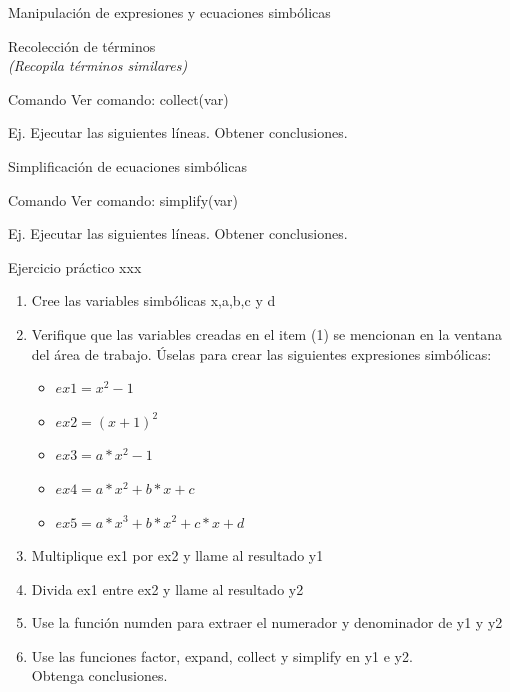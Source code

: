 \documentclass{bredelebeamer}
\begin{document}
\begin{frame}{Manipulación de expresiones y ecuaciones simbólicas}
\begin{center}
Recolección de términos\\
\textit{(Recopila términos similares)}
\end{center}
\begin{exampleblock}{Comando}
Ver comando: collect(var)
\end{exampleblock}
Ej. Ejecutar las siguientes líneas. Obtener conclusiones.
\end{frame}

\begin{frame}{Simplificación de ecuaciones simbólicas}
\begin{exampleblock}{Comando}
Ver comando: simplify(var)
\end{exampleblock}
Ej. Ejecutar las siguientes líneas. Obtener conclusiones.
\end{frame}

\begin{frame}{Ejercicio práctico xxx}
\begin{enumerate}
\item Cree las variables simbólicas x,a,b,c y d
\item Verifique que las variables creadas en el item (1) se mencionan en la ventana del área de trabajo. Úselas para crear las siguientes expresiones simbólicas:
\begin{itemize}
\item $ex1 = x^2-1$
\item $ex2 = (x+1)^2$
\item $ex3 = a*x^2-1$
\item $ex4 = a*x^2+b*x+c$
\item $ex5 = a*x^3+b*x^2+c*x+d$
\end{itemize}
\item Multiplique ex1 por ex2 y llame al resultado y1
\item Divida ex1 entre ex2 y llame al resultado y2
\item Use la función numden para extraer el numerador y denominador de y1 y y2
\item Use las funciones factor, expand, collect y simplify en y1 e y2.\\Obtenga conclusiones.
\end{enumerate}
\end{frame}
\end{document}
